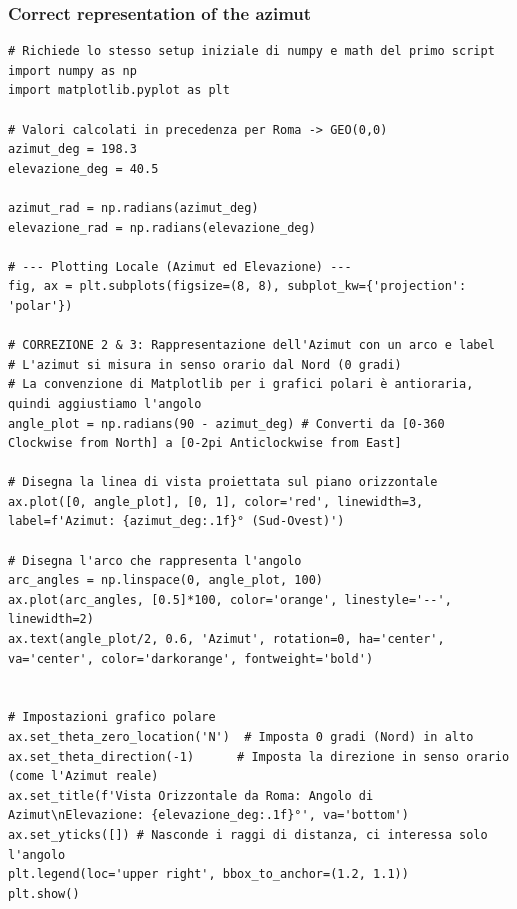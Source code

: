 \documentclass[a4paper,14pt]{article}
\begin{document}
\begin{itemize}
\subsubsection{Correct representation of the azimut}
{
\scriptsize
\begin{verbatim}
# Richiede lo stesso setup iniziale di numpy e math del primo script
import numpy as np
import matplotlib.pyplot as plt

# Valori calcolati in precedenza per Roma -> GEO(0,0)
azimut_deg = 198.3
elevazione_deg = 40.5

azimut_rad = np.radians(azimut_deg)
elevazione_rad = np.radians(elevazione_deg)

# --- Plotting Locale (Azimut ed Elevazione) ---
fig, ax = plt.subplots(figsize=(8, 8), subplot_kw={'projection': 'polar'})

# CORREZIONE 2 & 3: Rappresentazione dell'Azimut con un arco e label
# L'azimut si misura in senso orario dal Nord (0 gradi)
# La convenzione di Matplotlib per i grafici polari è antioraria, quindi aggiustiamo l'angolo
angle_plot = np.radians(90 - azimut_deg) # Converti da [0-360 Clockwise from North] a [0-2pi Anticlockwise from East]

# Disegna la linea di vista proiettata sul piano orizzontale
ax.plot([0, angle_plot], [0, 1], color='red', linewidth=3, label=f'Azimut: {azimut_deg:.1f}° (Sud-Ovest)')

# Disegna l'arco che rappresenta l'angolo
arc_angles = np.linspace(0, angle_plot, 100)
ax.plot(arc_angles, [0.5]*100, color='orange', linestyle='--', linewidth=2)
ax.text(angle_plot/2, 0.6, 'Azimut', rotation=0, ha='center', va='center', color='darkorange', fontweight='bold')


# Impostazioni grafico polare
ax.set_theta_zero_location('N')  # Imposta 0 gradi (Nord) in alto
ax.set_theta_direction(-1)      # Imposta la direzione in senso orario (come l'Azimut reale)
ax.set_title(f'Vista Orizzontale da Roma: Angolo di Azimut\nElevazione: {elevazione_deg:.1f}°', va='bottom')
ax.set_yticks([]) # Nasconde i raggi di distanza, ci interessa solo l'angolo
plt.legend(loc='upper right', bbox_to_anchor=(1.2, 1.1))
plt.show()
\end{verbatim}
}
\end{itemize}
\end{document}
